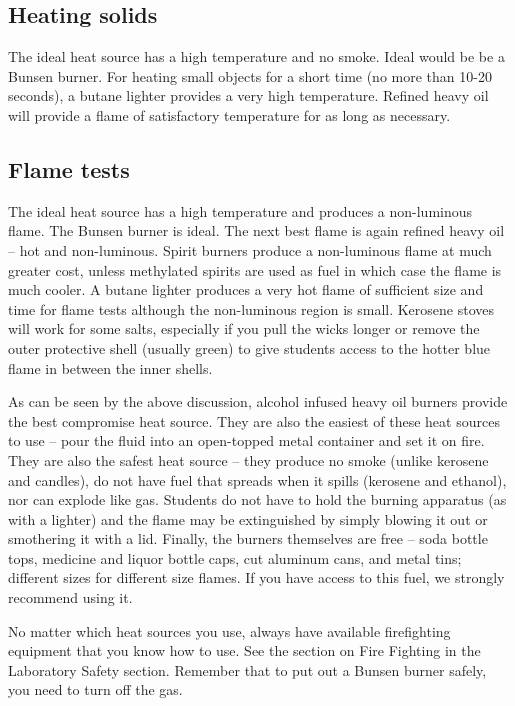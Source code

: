 \subsection{Heating solids}
The ideal heat source has a high temperature and no smoke. 
Ideal would be be a Bunsen burner. 
For heating small objects for a short time (no more than 10-20 seconds), 
a butane lighter provides a very high temperature. 
Refined heavy oil will provide a flame of satisfactory temperature 
for as long as necessary.

\subsection{Flame tests}
The ideal heat source has a high temperature 
and produces a non-luminous flame. 
The Bunsen burner is ideal. 
The next best flame is again refined heavy oil – hot and non-luminous. 
Spirit burners produce a non-luminous flame at much greater cost, 
unless methylated spirits are used as fuel 
in which case the flame is much cooler. 
A butane lighter produces a very hot flame of sufficient size 
and time for flame tests although the non-luminous region is small. 
Kerosene stoves will work for some salts, 
especially if you pull the wicks longer 
or remove the outer protective shell (usually green) 
to give students access to the hotter blue flame in between the inner shells.

As can be seen by the above discussion, 
alcohol infused heavy oil burners provide the best compromise heat source. 
They are also the easiest of these heat sources to use – 
pour the fluid into an open-topped metal container and set it on fire. 
They are also the safest heat source – 
they produce no smoke (unlike kerosene and candles), 
do not have fuel that spreads when it spills (kerosene and ethanol), 
nor can explode like gas. 
Students do not have to hold the burning apparatus (as with a lighter) 
and the flame may be extinguished by simply blowing it out 
or smothering it with a lid. 
Finally, 
the burners themselves are free – soda bottle tops, 
medicine and liquor bottle caps, 
cut aluminum cans, 
and metal tins; different sizes for different size flames. 
If you have access to this fuel, 
we strongly recommend using it.

No matter which heat sources you use, 
always have available firefighting equipment that you know how to use. 
See the section on Fire Fighting in the Laboratory Safety section. 
Remember that to put out a Bunsen burner safely, 
you need to turn off the gas.

